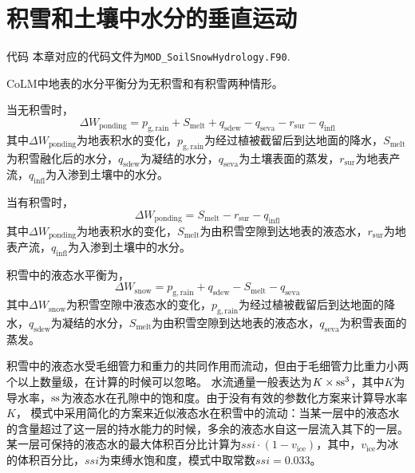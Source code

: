 \chapter{积雪和土壤中水分的垂直运动}\label{积雪和土壤中水分的垂直运动}

\begin{mymdframed}{代码}
  本章对应的代码文件为\texttt{MOD\_SoilSnowHydrology.F90}.
\end{mymdframed}

CoLM中地表的水分平衡分为无积雪和有积雪两种情形。

当无积雪时，
\begin{equation}
  \Delta W_{\mathrm{ponding}} = p_{\mathrm{g,rain}}+S_{\mathrm{melt}}+q_{\mathrm{sdew}}-q_{\mathrm{seva}}-r_{\mathrm{sur}}-q_{\mathrm{infl}}
\end{equation}
其中$\Delta W_{\mathrm{ponding}}$为地表积水的变化，$p_{\mathrm{g,rain}}$为经过植被截留后到达地面的降水，$S_{\mathrm{melt}}$为积雪融化后的水分，$q_{\mathrm{sdew}}$为凝结的水分，$q_{\mathrm{seva}}$为土壤表面的蒸发，$r_{\mathrm{sur}}$为地表产流，$q_{\mathrm{infl}}$为入渗到土壤中的水分。

当有积雪时，
\begin{equation}
  \Delta W_{\mathrm{ponding}} = S_{\mathrm{melt}}-r_{\mathrm{sur}}-q_{\mathrm{infl}}
\end{equation}
其中$\Delta W_{\mathrm{ponding}}$为地表积水的变化，$S_{\mathrm{melt}}$为由积雪空隙到达地表的液态水，$r_{\mathrm{sur}}$为地表产流，$q_{\mathrm{infl}}$为入渗到土壤中的水分。

积雪中的液态水平衡为，
\begin{equation}
  \Delta W_{\mathrm{snow}} = p_{\mathrm{g,rain}}+q_{\mathrm{sdew}}-S_{\mathrm{melt}}-q_{\mathrm{seva}}
\end{equation}
其中$\Delta W_{\mathrm{snow}}$为积雪空隙中液态水的变化，$p_{\mathrm{g,rain}}$为经过植被截留后到达地面的降水，$q_{\mathrm{sdew}}$为凝结的水分，$S_{\mathrm{melt}}$为由积雪空隙到达地表的液态水，$q_{\mathrm{seva}}$为积雪表面的蒸发。

积雪中的液态水受毛细管力和重力的共同作用而流动，但由于毛细管力比重力小两个以上数量级，在计算的时候可以忽略。
水流通量一般表达为$K\times{\rm ss}^3$，其中$K$为导水率，${\rm ss}$为液态水在孔隙中的饱和度。由于没有有效的参数化方案来计算导水率$K$，
模式中采用简化的方案来近似液态水在积雪中的流动：当某一层中的液态水的含量超过了这一层的持水能力的时候，多余的液态水自这一层流入其下的一层。
某一层可保持的液态水的最大体积百分比计算为$ssi\cdot\left(1-v_{\mathrm{ice}}\right)$，其中，$v_{\mathrm{ice}}$为冰的体积百分比，$ssi$为束缚水饱和度，模式中取常数$ssi=0.033$。

